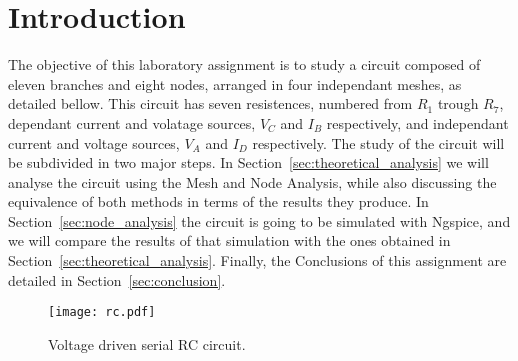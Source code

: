 \section{Introduction}
\label{sec:introduction}

The objective of this laboratory assignment is to study a circuit composed of eleven branches and eight nodes, arranged in four independant meshes,
 as detailed bellow. This circuit has seven resistences, numbered from $R_1$ trough $R_7$, dependant current and volatage sources, $V_C$ and $I_B$ respectively,
 and independant current and voltage sources, $V_A$ and $I_D$ respectively.
The study of the circuit will be subdivided in two major steps. In Section~\ref{sec:theoretical_analysis} we will analyse the circuit using the Mesh and Node Analysis,
while also discussing the equivalence of both methods in terms of the results they produce. In Section~\ref{sec:node_analysis} the circuit is going to be simulated
 with Ngspice, and we will compare the results of that simulation with the ones obtained in Section~\ref{sec:theoretical_analysis}.
Finally, the Conclusions of this assignment are detailed in Section~\ref{sec:conclusion}.

\begin{figure}[h] \centering
\texttt{[image: rc.pdf]}
\caption{Voltage driven serial RC circuit.}
\label{fig:rc}
\end{figure}




